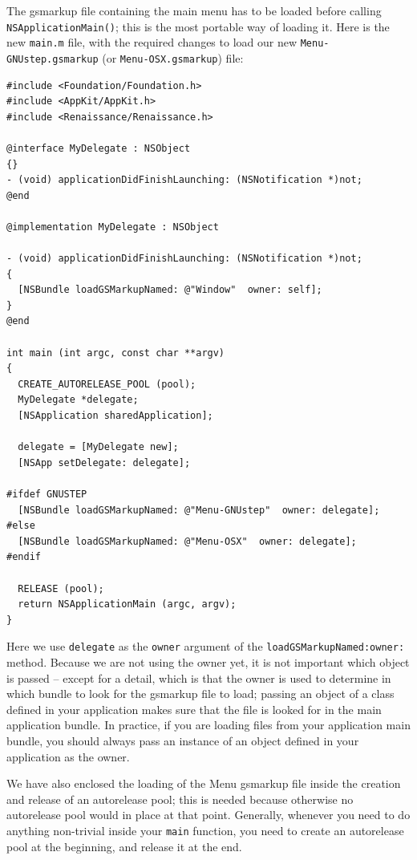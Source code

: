 \documentclass[a4paper]{article}
\begin{document}
The gsmarkup file containing the main menu has to be loaded before
calling \texttt{NSApplicationMain()}; this is the most portable way of
loading it.  Here is the new \texttt{main.m} file, with the required
changes to load our new \texttt{Menu-GNUstep.gsmarkup} (or
\texttt{Menu-OSX.gsmarkup}) file:
\begin{verbatim}
#include <Foundation/Foundation.h>
#include <AppKit/AppKit.h>
#include <Renaissance/Renaissance.h>

@interface MyDelegate : NSObject
{}
- (void) applicationDidFinishLaunching: (NSNotification *)not;
@end

@implementation MyDelegate : NSObject 

- (void) applicationDidFinishLaunching: (NSNotification *)not;
{
  [NSBundle loadGSMarkupNamed: @"Window"  owner: self];
}
@end

int main (int argc, const char **argv)
{ 
  CREATE_AUTORELEASE_POOL (pool);
  MyDelegate *delegate;
  [NSApplication sharedApplication];

  delegate = [MyDelegate new];
  [NSApp setDelegate: delegate];

#ifdef GNUSTEP
  [NSBundle loadGSMarkupNamed: @"Menu-GNUstep"  owner: delegate];
#else
  [NSBundle loadGSMarkupNamed: @"Menu-OSX"  owner: delegate];
#endif

  RELEASE (pool);
  return NSApplicationMain (argc, argv);
}
\end{verbatim}
Here we use \texttt{delegate} as the \texttt{owner} argument of the
\texttt{loadGSMarkupNamed:owner:} method.  Because we are not using
the owner yet, it is not important which object is passed -- except
for a detail, which is that the owner is used to determine in which
bundle to look for the gsmarkup file to load; passing an object of a
class defined in your application makes sure that the file is looked
for in the main application bundle.  In practice, if you are loading
files from your application main bundle, you should always pass an
instance of an object defined in your application as the owner.

We have also enclosed the loading of the Menu gsmarkup file inside the
creation and release of an autorelease pool; this is needed because
otherwise no autorelease pool would in place at that point.
Generally, whenever you need to do anything non-trivial inside your
\texttt{main} function, you need to create an autorelease pool at the
beginning, and release it at the end.
\end{document}
